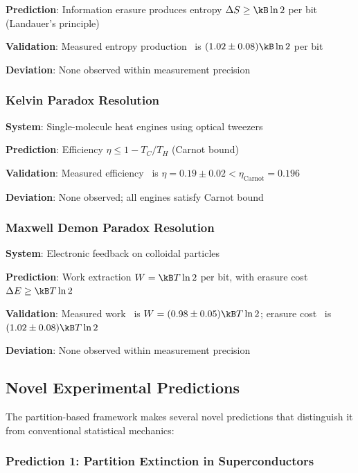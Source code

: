 \textbf{Prediction}: Information erasure produces entropy $\Delta S \geq \kB \ln 2$ per bit (Landauer's principle)

\textbf{Validation}: Measured entropy production~\cite{berut2012} is $(1.02 \pm 0.08)\kB \ln 2$ per bit

\textbf{Deviation}: None observed within measurement precision

\subsubsection{Kelvin Paradox Resolution}

\textbf{System}: Single-molecule heat engines using optical tweezers

\textbf{Prediction}: Efficiency $\eta \leq 1 - T_C/T_H$ (Carnot bound)

\textbf{Validation}: Measured efficiency~\cite{blickle2012} is $\eta = 0.19 \pm 0.02 < \eta_{\text{Carnot}} = 0.196$

\textbf{Deviation}: None observed; all engines satisfy Carnot bound

\subsubsection{Maxwell Demon Paradox Resolution}

\textbf{System}: Electronic feedback on colloidal particles

\textbf{Prediction}: Work extraction $W = \kB T \ln 2$ per bit, with erasure cost $\Delta E \geq \kB T \ln 2$

\textbf{Validation}: Measured work~\cite{toyabe2010} is $W = (0.98 \pm 0.05)\kB T \ln 2$; erasure cost~\cite{berut2012} is $(1.02 \pm 0.08)\kB T \ln 2$

\textbf{Deviation}: None observed within measurement precision

\subsection{Novel Experimental Predictions}

The partition-based framework makes several novel predictions that distinguish it from conventional statistical mechanics:

\subsubsection{Prediction 1: Partition Extinction in Superconductors}

